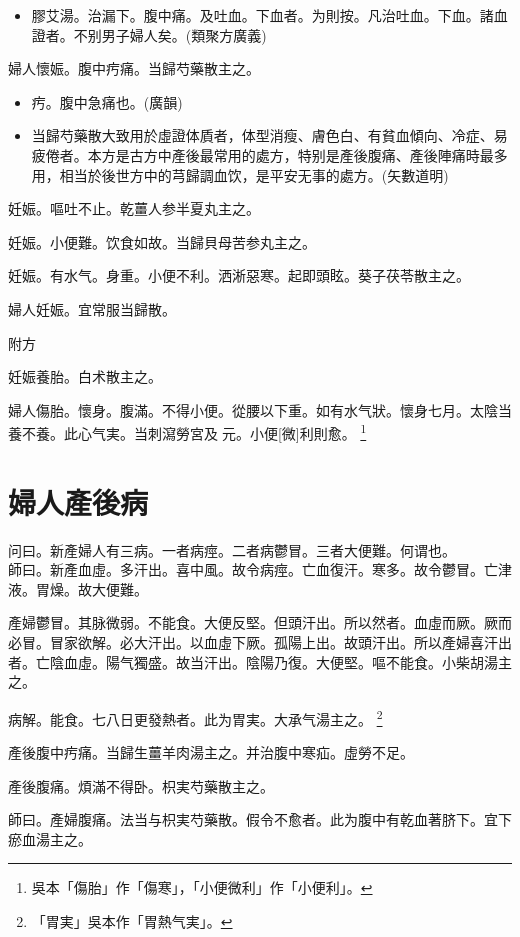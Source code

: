 \documentclass[oneside,b4paper]{ctexbook}
\begin{document}
\begin{flushleft}
\begin{itemize}
\item 膠艾湯。治漏下。腹中痛。及吐血。下血者。为則按。凡治吐血。下血。諸血證者。不别男子婦人矣。(類聚方廣義)
\end{itemize}

婦人懷娠。腹中㽲痛。当歸芍藥散主之。

\begin{itemize}
\item 㽲。腹中急痛也。(廣韻)
\item 当歸芍藥散大致用於虛證体貭者，体型消瘦、膚色白、有貧血傾向、冷症、易疲倦者。本方是古方中產後最常用的處方，特别是產後腹痛、產後陣痛時最多用，相当於後世方中的芎歸調血饮，是平安无事的處方。(矢數道明)
\end{itemize}

妊娠。嘔吐不止。乾薑人参半夏丸主之。

妊娠。小便難。饮食如故。当歸貝母苦参丸主之。

妊娠。有水气。身重。小便不利。洒淅惡寒。起即頭眩。葵子茯苓散主之。

婦人妊娠。宜常服当歸散。

附方

妊娠養胎。白术散主之。

婦人傷胎。懷身。腹滿。不得小便。從腰以下重。如有水气狀。懷身七月。太陰当養不養。此心气実。当刺瀉勞宮及{𬮦}元。小便[微]利則愈。
\footnote{吳本「傷胎」作「傷寒」，「小便微利」作「小便利」。}

\chapter{婦人產後病}

问曰。新產婦人有三病。一者病痙。二者病鬱冒。三者大便難。何谓也。\\
師曰。新產血虛。多汗出。喜中風。故令病痙。亡血復汗。寒多。故令鬱冒。亡津液。胃燥。故大便難。

產婦鬱冒。其脉微弱。不能食。大便反堅。但頭汗出。所以然者。血虛而厥。厥而必冒。冒家欲解。必大汗出。以血虛下厥。孤陽上出。故頭汗出。所以產婦喜汗出者。亡陰血虛。陽气獨盛。故当汗出。陰陽乃復。大便堅。嘔不能食。小柴胡湯主之。

病解。能食。七八日更發熱者。此为胃実。大承气湯主之。
\footnote{「胃実」吳本作「胃熱气実」。}

產後腹中㽲痛。当歸生薑羊肉湯主之。并治腹中寒疝。虛勞不足。

產後腹痛。煩滿不得卧。枳実芍藥散主之。

師曰。產婦腹痛。法当与枳実芍藥散。假令不愈者。此为腹中有乾血著脐下。宜下瘀血湯主之。


\end{flushleft}
\end{document}

